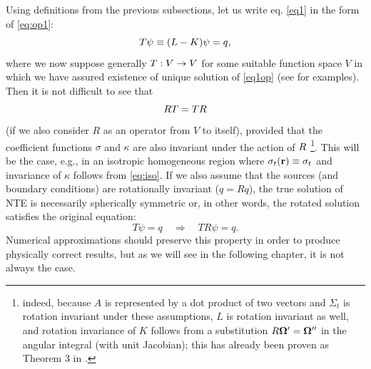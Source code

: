 Using definitions from the previous subsections, let us write eq. \eqref{eq1} in the form of \eqref{eq:op1}:
\begin{equation}\label{eq1op}
	T\psi \equiv (L - K)\psi = q,
\end{equation} 
where we now suppose generally $T:V\to V$ for some suitable function space $V$ in which we have assured existence
of unique solution of \eqref{eq1op} (see  for examples). Then it is not difficult to see that
\begin{equation}\label{eq:commut_NTE}
	RT = TR
\end{equation}
(if we also consider $R$ as an operator from $V$ to itself),
provided that the coefficient functions $\sigma$ and $\kappa$ are also invariant under the action of $R$ \footnote{
indeed, because $A$ is represented by a dot product of two vectors and $\Sigma_t$ is rotation invariant under these
assumptions, $L$ is rotation invariant as well, and rotation invariance of $K$ follows from a substitution $R\mathbf{\Omega}' = \mathbf{\Omega}''$ in the
angular integral (with unit Jacobian); this has already been proven as Theorem 3 in \cite{Zweifel}.}.
This will be the case, e.g., in an isotropic homogeneous region where  $\sigma_t(\mathbf{r}) \equiv \sigma_t$ and invariance of
$\kappa$ follows from \eqref{eq:iso}. If we also assume that the sources (and
boundary conditions) are  rotationally invariant ($q = Rq$), the true solution of NTE is necessarily
spherically symmetric or, in other words, the rotated solution satisfies the original equation: 
$$
T\psi = q \quad \Rightarrow \quad TR\psi = q.
$$
Numerical approximations should preserve this property in order to produce physically correct results, but as we will
see in the following chapter, it is not always the case.
